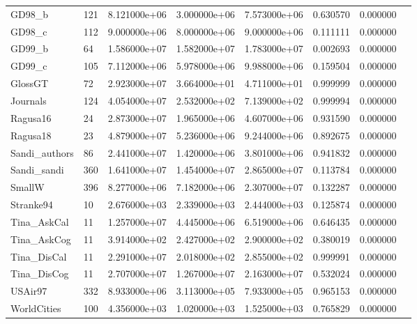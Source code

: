\begin{tabular}{llrrrrrr}
GD98\_b                  &  121 &  8.121000e+06 &  3.000000e+06 &  7.573000e+06 &  0.630570 &  0.000000 \\
GD98\_c                  &  112 &  9.000000e+06 &  8.000000e+06 &  9.000000e+06 &  0.111111 &  0.000000 \\
GD99\_b                  &   64 &  1.586000e+07 &  1.582000e+07 &  1.783000e+07 &  0.002693 &  0.000000 \\
GD99\_c                  &  105 &  7.112000e+06 &  5.978000e+06 &  9.988000e+06 &  0.159504 &  0.000000 \\
GlossGT                 &   72 &  2.923000e+07 &  3.664000e+01 &  4.711000e+01 &  0.999999 &  0.000000 \\
Journals                &  124 &  4.054000e+07 &  2.532000e+02 &  7.139000e+02 &  0.999994 &  0.000000 \\
Ragusa16                &   24 &  2.873000e+07 &  1.965000e+06 &  4.607000e+06 &  0.931590 &  0.000000 \\
Ragusa18                &   23 &  4.879000e+07 &  5.236000e+06 &  9.244000e+06 &  0.892675 &  0.000000 \\
Sandi\_authors           &   86 &  2.441000e+07 &  1.420000e+06 &  3.801000e+06 &  0.941832 &  0.000000 \\
Sandi\_sandi             &  360 &  1.641000e+07 &  1.454000e+07 &  2.865000e+07 &  0.113784 &  0.000000 \\
SmallW                  &  396 &  8.277000e+06 &  7.182000e+06 &  2.307000e+07 &  0.132287 &  0.000000 \\
Stranke94               &   10 &  2.676000e+03 &  2.339000e+03 &  2.444000e+03 &  0.125874 &  0.000000 \\
Tina\_AskCal             &   11 &  1.257000e+07 &  4.445000e+06 &  6.519000e+06 &  0.646435 &  0.000000 \\
Tina\_AskCog             &   11 &  3.914000e+02 &  2.427000e+02 &  2.900000e+02 &  0.380019 &  0.000000 \\
Tina\_DisCal             &   11 &  2.291000e+07 &  2.018000e+02 &  2.855000e+02 &  0.999991 &  0.000000 \\
Tina\_DisCog             &   11 &  2.707000e+07 &  1.267000e+07 &  2.163000e+07 &  0.532024 &  0.000000 \\
USAir97                 &  332 &  8.933000e+06 &  3.113000e+05 &  7.933000e+05 &  0.965153 &  0.000000 \\
WorldCities             &  100 &  4.356000e+03 &  1.020000e+03 &  1.525000e+03 &  0.765829 &  0.000000 \\

\end{tabular}

